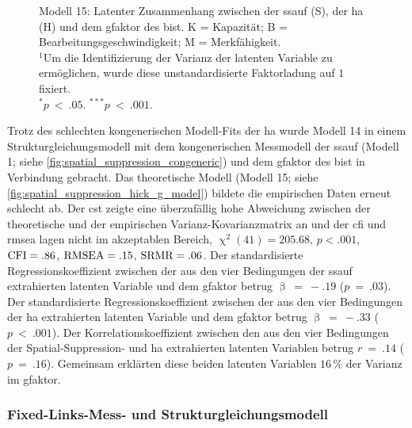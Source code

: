 \documentclass[11pt, twoside, a4paper]{book}		%
\begin{document}
\begin{figure}[p]
\begin{adjustbox}{width=1\textwidth, keepaspectratio}
\begin{tikzpicture}
		\end{tikzpicture}
	\end{adjustbox}
	\vspace{.2cm}
	\caption[Modell 15: Latenter Zusammenhang zwischen der Spa\-ti\-al-Sup\-pres\-sion-, der \gls{ha} und dem \gls{gfaktor}]{Modell 15: Latenter Zusammenhang zwischen der \gls{ssauf} (\textsf{S}), der \gls{ha} (\textsf{H}) und dem \gls{gfaktor} des \gls{bist}. \textsf{K} = Kapazität; \textsf{B} = Bearbeitungsgeschwindigkeit; \textsf{M} = Merkfähigkeit.\\
		$^1$Um die Identifizierung der Varianz der latenten Variable zu ermöglichen, wurde diese unstandardisierte Faktorladung auf $1$ fixiert.\\
		$^{*}p~<~.05$. $^{***}p~<~.001$.}
	\label{fig:spatial_suppression_hick_g_model}
\end{figure}

Trotz des schlechten kongenerischen Modell-Fits der \gls{ha} wurde Modell 14 in einem Strukturgleichungsmodell mit dem kongenerischen Messmodell der \gls{ssauf} (Modell 1; siehe \autoref{fig:spatial_suppression_congeneric}) und dem \gls{gfaktor} des \gls{bist} in Verbindung gebracht. Das theoretische Modell (Modell 15; siehe \autoref{fig:spatial_suppression_hick_g_model}) bildete die empirischen Daten erneut schlecht ab.  Der \gls{cst} zeigte eine überzufällig hohe Abweichung zwischen der theoretische und der empirischen Var\-ianz-Ko\-var\-ianz\-ma\-trix an und der \gls{cfi} und \gls{rmsea} lagen nicht im akzeptablen Bereich, $\upchi^2(41)=205.68$, $p<.001$, $\textnormal{CFI}=.86$, $\textnormal{RMSEA}=.15$, $\textnormal{SRMR}=.06$. 
Der standardisierte Regressionskoeffizient zwischen der aus den vier Bedingungen der \gls{ssauf} extrahierten latenten Variable und dem \gls{gfaktor} betrug $\upbeta~=~-.19$ ($p~=~.03$). Der standardisierte Regressionskoeffizient zwischen der aus den vier Bedingungen der \gls{ha} extrahierten latenten Variable und dem \gls{gfaktor} betrug $\upbeta~=~-.33$ ($p~<~.001$). Der Korrelationskoeffizient zwischen den aus den vier Bedingungen der Spatial-Suppression- und \gls{ha} extrahierten latenten Variablen betrug $r~=~.14$ ($p~=~.16$). Gemeinsam erklärten diese beiden latenten Variablen $16\,\%$ der Varianz im \gls{gfaktor}.




\subsubsection*{Fixed-Links-Mess- und Strukturgleichungsmodell}
\end{document}
